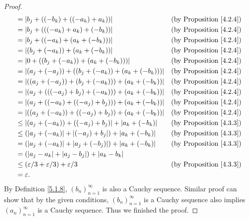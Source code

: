 \begin{proof}
\begin{align*}
                         & = \abs*{b_j + ((-b_k) + ((-a_k) + a_k))}                               & \text{(by Proposition \ref{4.2.4})} \\
                         & = \abs*{b_j + (((-a_k) + a_k) + (-b_k))}                               & \text{(by Proposition \ref{4.2.4})} \\
                         & = \abs*{b_j + ((-a_k) + (a_k + (-b_k)))}                               & \text{(by Proposition \ref{4.2.4})} \\
                         & = \abs*{(b_j + (-a_k)) + (a_k + (-b_k))}                               & \text{(by Proposition \ref{4.2.4})} \\
                         & = \abs*{0 + ((b_j + (-a_k)) + (a_k + (-b_k)))}                         & \text{(by Proposition \ref{4.2.4})} \\
                         & = \abs*{(a_j + (-a_j)) + ((b_j + (-a_k)) + (a_k + (-b_k)))}            & \text{(by Proposition \ref{4.2.4})} \\
                         & = \abs*{((a_j + (-a_j)) + (b_j + (-a_k))) + (a_k + (-b_k))}            & \text{(by Proposition \ref{4.2.4})} \\
                         & = \abs*{(a_j + (((-a_j) + b_j) + (-a_k))) + (a_k + (-b_k))}            & \text{(by Proposition \ref{4.2.4})} \\
                         & = \abs*{(a_j + ((-a_k) + ((-a_j) + b_j))) + (a_k + (-b_k))}            & \text{(by Proposition \ref{4.2.4})} \\
                         & = \abs*{((a_j + (-a_k)) + ((-a_j) + b_j)) + (a_k + (-b_k))}            & \text{(by Proposition \ref{4.2.4})} \\
                         & \leq \abs*{(a_j + (-a_k)) + ((-a_j) + b_j)} + \abs*{a_k + (-b_k)}      & \text{(by Proposition \ref{4.3.3})} \\
                         & \leq (\abs*{a_j + (-a_k)} + \abs*{(-a_j) + b_j}) + \abs*{a_k + (-b_k)} & \text{(by Proposition \ref{4.3.3})} \\
                         & = (\abs*{a_j + (-a_k)} + \abs*{a_j + (-b_j)}) + \abs*{a_k + (-b_k)}    & \text{(by Proposition \ref{4.3.3})} \\
                         & = (\abs*{a_j - a_k} + \abs*{a_j - b_j}) + \abs*{a_k - b_k}                                                   \\
                         & \leq (\varepsilon / 3 + \varepsilon / 3) + \varepsilon / 3             & \text{(by Proposition \ref{4.3.3})} \\
                         & = \varepsilon.
    \end{align*}
    By Definition \ref{5.1.8}, \((b_n)_{n = 1}^{\infty}\) is also a Cauchy sequence.
    Similar proof can show that by the given conditions, \((b_n)_{n = 1}^{\infty}\) is a Cauchy sequence also implies \((a_n)_{n = 1}^{\infty}\) is a Cauchy sequence.
    Thus we finished the proof.
\end{proof}

